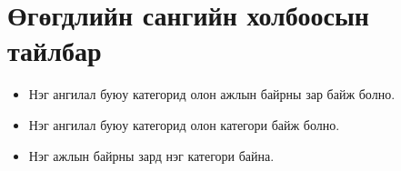 \section{Өгөгдлийн сангийн холбоосын тайлбар}
\begin{itemize}
  \item Нэг ангилал буюу категорид олон ажлын байрны зар байж болно.
  \item Нэг ангилал буюу категорид олон категори байж болно. 
  \item Нэг ажлын байрны зард нэг категори байна.
\end{itemize}